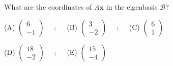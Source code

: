 \documentclass[12pt]{amsart}
\begin{document}
What are the coordinates of $A\mathbf{x}$ in the eigenbasis $\mathcal{B}$?

(A) $\begin{pmatrix} 6 \\ -1 \end{pmatrix}$
$\quad : \quad$
(B) $\begin{pmatrix} 3 \\ -2 \end{pmatrix}$
$\quad : \quad$
(C) $\begin{pmatrix} 6 \\ 1 \end{pmatrix}$


(D) $\begin{pmatrix} 18 \\ -2 \end{pmatrix}$
$\quad : \quad$
(E) $\begin{pmatrix} 15 \\ -4 \end{pmatrix}$

\bigskip

\end{document}
